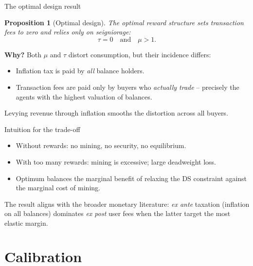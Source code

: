 \documentclass[aspectratio=169,xcolor=dvipsnames]{beamer}
\newtheorem{proposition}{Proposition}
\begin{document}
\begin{frame}{The optimal design result}
    \begin{proposition}[Optimal design]
        The optimal reward structure sets transaction fees to zero and relies only on
        seigniorage:
        \[
            \boxed{\;\tau = 0 \quad\text{and}\quad \mu > 1.\;}
        \]
    \end{proposition}
    \vspace{3mm}
    \textbf{Why?} Both $\mu$ and $\tau$ distort consumption, but their incidence differs:
    \begin{itemize}
        \item Inflation tax is paid by \emph{all} balance holders.
        \item Transaction fees are paid only by buyers who \emph{actually trade} -- precisely
              the agents with the highest valuation of balances.
    \end{itemize}
    Levying revenue through inflation smooths the distortion across all buyers.
\end{frame}

\begin{frame}{Intuition for the trade-off}
    \begin{itemize}
        \item Without rewards: no mining, no security, no equilibrium.
        \item With too many rewards: mining is excessive; large deadweight loss.
        \item Optimum balances the marginal benefit of relaxing the DS constraint
              against the marginal cost of mining.
    \end{itemize}
    \vspace{3mm}
    The result aligns with the broader monetary literature: \emph{ex ante} taxation (inflation
    on all balances) dominates \emph{ex post} user fees when the latter target the most
    elastic margin.
\end{frame}

\section{Calibration}
\end{document}
